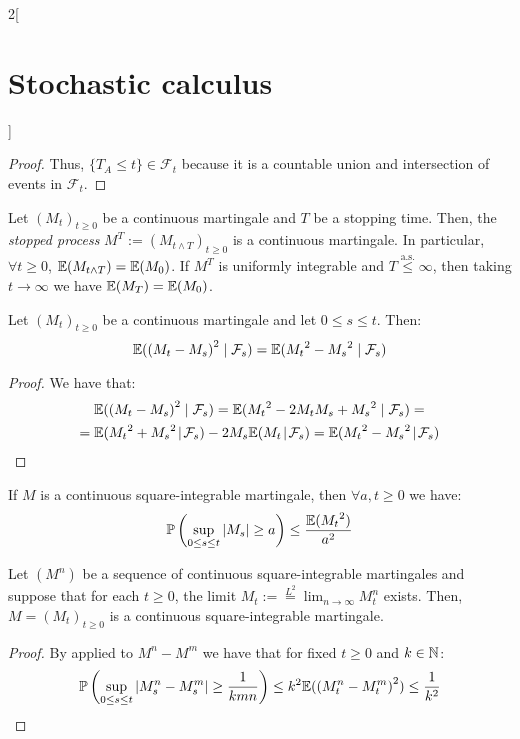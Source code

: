 \documentclass[../../../main_math.tex]{subfiles}
\begin{document}
\begin{multicols}{2}[\section{Stochastic calculus}]
\begin{proof}
    Thus, $\{T_A \leq t\}\in \mathcal{F}_t$ because it is a countable union and intersection of events in $\mathcal{F}_t$.
  \end{proof}
  \begin{theorem}\label{SC:doob_sampling}
    Let ${(M_t)}_{t\geq 0}$ be a continuous martingale and $T$ be a stopping time. Then, the \emph{stopped process} $M^T:={(M_{t\wedge T})}_{t\geq 0}$ is a continuous martingale. In particular, $\forall t\geq 0$, $\mathbb{E}(M_{t\wedge T})=\mathbb{E}(M_0)$. If $M^T$ is uniformly integrable and $T\overset{\text{a.s.}}{\leq}\infty$, then taking $t\to\infty$ we have $\mathbb{E}(M_T)=\mathbb{E}(M_0)$.
  \end{theorem}
  \begin{lemma}\label{SC:orthogonality_martingales}
    Let ${(M_t)}_{t\geq 0}$ be a continuous martingale and let $0\leq s\leq t$. Then:
    $$
      \mathbb{E}({(M_t-M_s)}^2\mid \mathcal{F}_s)=\mathbb{E}({M_t}^2-{M_s}^2\mid \mathcal{F}_s)
    $$
  \end{lemma}
  \begin{proof}
    We have that:
    \begin{multline*}
      \mathbb{E}({(M_t-M_s)}^2\mid \mathcal{F}_s) =\mathbb{E}({M_t}^2-2M_tM_s+{M_s}^2\mid \mathcal{F}_s) =\\=\mathbb{E}({M_t}^2+{M_s}^2\!\mid \!\mathcal{F}_s)-2M_s\mathbb{E}(M_t\!\mid\! \mathcal{F}_s) =\mathbb{E}({M_t}^2-{M_s}^2\!\mid\! \mathcal{F}_s)
    \end{multline*}
  \end{proof}
  \begin{theorem}\label{SC:doob_maximal}
    If $M$ is a continuous square-integrable martingale, then $\forall a,t\geq 0$ we have:
    $$
      \mathbb{P}\left(\sup_{0\leq s\leq t}\abs{M_s}\geq a\right)\leq \frac{\mathbb{E}({M_t}^2)}{a^2}
    $$
  \end{theorem}
  \begin{proposition}\label{SC:limit_of_martingales}
    Let $(M^n)$ be a sequence of continuous square-integrable martingales and suppose that for each $t\geq 0$, the limit $\displaystyle M_t:=\overset{L^2}{=}\lim_{n\to\infty}M_t^n$ exists. Then, $M={(M_t)}_{t\geq 0}$ is a continuous square-integrable martingale.
  \end{proposition}
  \begin{proof}
    By  applied to $M^n-M^m$ we have that for fixed $t\geq 0$ and $k\in\mathbb{N}$:
    $$
      \mathbb{P}\left(\sup_{0\leq s\leq t}\abs{M_s^n-M_s^m}\geq \frac{1}{kmn }\right)\leq k^2\mathbb{E}({(M_t^n-M_t^m)}^2)\leq \frac{1}{k^2}
$$
\end{proof}
\end{multicols}
\end{document}
